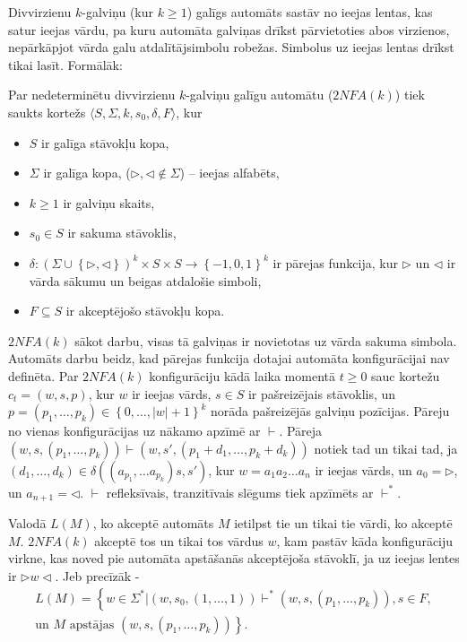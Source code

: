 \documentclass{ludis}
\begin{document}
Divvirzienu $k$-galviņu (kur $k\geq 1$) galīgs automāts sastāv no ieejas lentas, kas satur ieejas vārdu, pa kuru automāta galviņas drīkst pārvietoties abos virzienos, nepārkāpjot vārda galu atdalītājsimbolu  robežas. Simbolus uz ieejas lentas drīkst tikai lasīt. Formālāk:
\begin{definicija}
Par nedeterminētu divvirzienu $k$-galviņu galīgu automātu ($2NFA(k)$) tiek saukts kortežs $\langle S, \Sigma, k, s_0, \delta, F \rangle$, kur
\begin{itemize}
	\item $S$ ir galīga stāvokļu kopa,
	\item $\Sigma$ ir galīga kopa, ($ \triangleright,\triangleleft \notin \Sigma$) -- ieejas alfabēts,
	\item $k\geq 1$ ir galviņu skaits, 
	\item $s_0\in S$ ir sakuma stāvoklis,
	\item $\delta: \left( \Sigma \cup \left\{ \triangleright, \triangleleft \right\} \right)^k \times S \times S \rightarrow \left\{-1,0,1\right\}^k$ ir pārejas funkcija, kur $\triangleright$ un $\triangleleft$ ir vārda sākumu un beigas atdalošie simboli,
	\item $F \subseteq S$ ir akceptējošo stāvokļu kopa.
\end{itemize}
\end{definicija}
$2NFA(k)$ sākot darbu, visas tā galviņas ir novietotas uz vārda sakuma simbola. Automāts darbu beidz, kad pārejas funkcija dotajai automāta konfigurācijai nav definēta. Par $2NFA(k)$ konfigurāciju kādā laika momentā $t\geq 0$ sauc kortežu $c_t=\left(w,s,p\right)$, kur $w$ ir ieejas vārds, $s\in S$ ir pašreizējais stāvoklis, un
$p = \left( p_1, \ldots, p_k \right) \in \left\{ 0, \ldots, |w| +1 \right\}^k $
norāda pašreizējās galviņu pozīcijas. Pāreju no vienas konfigurācijas uz nākamo apzīmē ar $\vdash$. Pāreja
$\left( w, s, \left( p_1, \ldots, p_k \right) \right) \vdash \left( w, s', \left( p_1+d_1, \ldots, p_k+d_k \right) \right)$
notiek tad un tikai tad, ja
$\left(d_1, \ldots, d_k \right) \in \delta \left( \left( a_{p_1}, \ldots a_{p_k} \right) s, s' \right)$,
kur $w = a_1a_2 \ldots a_n$ ir ieejas vārds, un $a_0=\triangleright$, un $a_{n+1}=\triangleleft$. $\vdash$ refleksīvais, tranzitīvais slēgums tiek apzīmēts ar $\vdash^*$.

Valodā $L(M)$, ko akceptē automāts $M$ ietilpst tie un tikai tie vārdi, ko akceptē $M$. $2NFA(k)$ akceptē tos un tikai tos vārdus $w$, kam pastāv kāda konfigurāciju virkne, kas noved pie automāta apstāšanās akceptējoša stāvoklī, ja uz ieejas lentes ir
$\triangleright w \triangleleft$. Jeb precīzāk - 
\begin{multline*}
	L(M)=\left\{ w \in \Sigma^* | \left(w,s_0,\left(1,\ldots,1\right)\right) \vdash^* \left(w,s,\left(p_1,\ldots,p_k\right)\right), s \in F,\right.\\
	\left.\textrm{un } M \textrm{ apstājas } \left(w,s,\left(p_1,\ldots,p_k\right)\right)\right\}.
\end{multline*}
\end{document}
